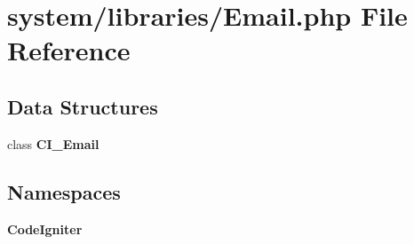\section{system/libraries/\-Email.php File Reference}
\label{_email_8php}
\subsection*{Data Structures}
\begin{DoxyCompactItemize}
\item 
class {\bf C\-I\-\_\-\-Email}
\end{DoxyCompactItemize}
\subsection*{Namespaces}
\begin{DoxyCompactItemize}
\item 
{\bf Code\-Igniter}
\end{DoxyCompactItemize}
